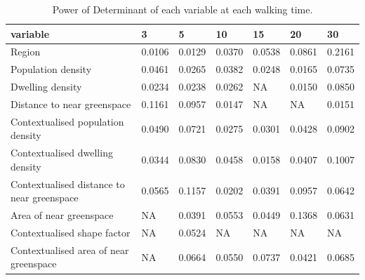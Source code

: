 \begin{table}[t]\centering
\caption{Power of Determinant of each variable at each walking time.}\label{tab:pd}
\begin{tabular}{lllllll}
\hline
variable & 3 & 5 & 10 & 15 & 20 & 30 \\
\hline
Region & 0.0106 & 0.0129 & 0.0370 & 0.0538 & 0.0861 & 0.2161 \\
Population density & 0.0461 & 0.0265 & 0.0382 & 0.0248 & 0.0165 & 0.0735 \\
Dwelling density & 0.0234 & 0.0238 & 0.0262 & NA & 0.0150 & 0.0850 \\
Distance to near greenspace & 0.1161 & 0.0957 & 0.0147 & NA & NA & 0.0151 \\
Contextualised population density & 0.0490 & 0.0721 & 0.0275 & 0.0301 & 0.0428 & 0.0902 \\
Contextualised dwelling density & 0.0344 & 0.0830 & 0.0458 & 0.0158 & 0.0407 & 0.1007 \\
Contextualised distance to near greenspace & 0.0565 & 0.1157 & 0.0202 & 0.0391 & 0.0957 & 0.0642 \\
Area of near greenspace & NA & 0.0391 & 0.0553 & 0.0449 & 0.1368 & 0.0631 \\
Contextualised shape factor & NA & 0.0524 & NA & NA & NA & NA \\
Contextualised area of near greenspace & NA & 0.0664 & 0.0550 & 0.0737 & 0.0421 & 0.0685 \\
\hline
\end{tabular}\end{table}
